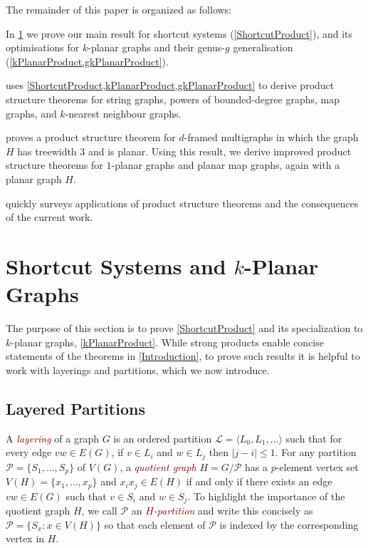\documentclass{patmorin}
\theoremstyle{plain}
\theoremstyle{definition}
\newcommand{\defin}[1]{\textcolor{Maroon}{\emph{#1}}}
\newcommand{\note}[2]{\noindent{\color{red}[#1:~#2]}}
\newcommand{\PP}{\mathcal{P}}
\renewcommand{\leq}{\leqslant}
\begin{document}
The remainder of this paper is organized as follows:
\begin{compactitem}
  \item In \cref{Structure} we prove our main result for shortcut systems (\cref{ShortcutProduct}), and its optimisations for $k$-planar graphs and their genus-$g$ generalisation (\cref{kPlanarProduct,gkPlanarProduct}).
  \item {} uses \cref{ShortcutProduct,kPlanarProduct,gkPlanarProduct} to derive product structure theorems for string graphs, powers of bounded-degree graphs, map graphs, and $k$-nearest neighbour graphs.
  \item {} proves a product structure theorem for $d$-framed multigraphs in which the graph $H$ has treewidth $3$ and is planar.  Using this result, we derive improved product structure theorems for $1$-planar graphs and planar map graphs, again with a planar graph $H$.
  \item {} quickly surveys applications of product structure theorems and the consequences of the current work.
\end{compactitem}




\section{\boldmath Shortcut Systems and $k$-Planar Graphs}
\label{Structure}

The purpose of this section is to prove \cref{ShortcutProduct} and its specialization to $k$-planar graphs, \cref{kPlanarProduct}. While strong products enable concise statements of the theorems in \cref{Introduction}, to prove such results it is helpful to work with layerings and partitions, which we now introduce.

\subsection{Layered Partitions}

A \defin{layering} of a graph $G$
is an ordered partition $\mathcal{L}=\langle L_0,L_1,\ldots\rangle $ such that for every edge
$vw\in E(G)$, if $v\in L_i$ and $w\in L_j$ then $|j-i|\leq 1$.  For any partition $\PP=\{S_1,\ldots,S_p\}$ of $V(G)$, a \defin{quotient graph} $H=G/\PP$ has a $p$-element vertex set $V(H)=\{x_1,\ldots,x_p\}$ and $x_ix_j\in E(H)$ if and only if there exists an edge $vw\in E(G)$ such that $v\in S_i$ and $w\in S_j$. To highlight the importance of the quotient graph $H$, we call $\PP$ an \defin{$H$-partition} and write this concisely as $\PP=\{S_x : x\in V(H)\}$ so that each element of $\PP$ is indexed by the corresponding vertex in $H$.
\end{document}
